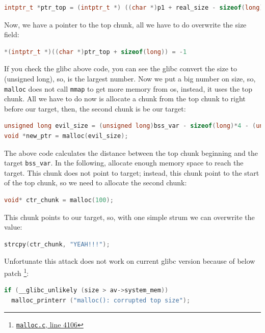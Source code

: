 \documentclass{masterthesis}
\newcommand*\libc{glibc}
\newcommand*\mallocc{\lstinline{malloc}\xspace}
\newcommand*\mmapc{\lstinline{mmap}\xspace}
\begin{document}
\begin{lstlisting}[language=c,frame=tlrb]
intptr_t *ptr_top = (intptr_t *) ((char *)p1 + real_size - sizeof(long));
\end{lstlisting}

Now, we have a pointer to the top chunk, all we have to do overwrite the size field:

\begin{lstlisting}[language=c,frame=tlrb]
*(intptr_t *)((char *)ptr_top + sizeof(long)) = -1
\end{lstlisting}

If you check the \libc{} above code, you can see the \libc{} convert the size to (unsigned long), so,  is the largest number. Now we put a big number on size, so, \mallocc{} does not call \mmapc{} to get more memory from os, instead, it uses the top chunk. All we have to do now is allocate a chunk from the top chunk to right before our target, then, the second chunk is be our target:

\begin{lstlisting}[language=c,frame=tlrb]
unsigned long evil_size = (unsigned long)bss_var - sizeof(long)*4 - (unsigned long)ptr_top;
void *new_ptr = malloc(evil_size);
\end{lstlisting}

The above code calculates the distance between the top chunk beginning and the target \lstinline{bss_var}. In the following, allocate enough memory space to reach the target. This chunk does not point to target; instead, this chunk point to the start of the top chunk, so we need to allocate the second chunk:

\begin{lstlisting}[language=c,frame=tlrb]
void* ctr_chunk = malloc(100);
\end{lstlisting}

This chunk points to our target, so, with one simple strum we can overwrite the value:

\begin{lstlisting}[language=c,frame=tlrb]
strcpy(ctr_chunk, "YEAH!!!");
\end{lstlisting}

Unfortunate this attack does not work on current \libc{} version because of below patch \footnote{\href{https://sourceware.org/git/?p=glibc.git;a=blob;f=malloc/malloc.c;h=f7cd29bc2f93e1082ee77800bd64a4b2a2897055;hb=9ea3686266dca3f004ba874745a4087a89682617\#l4106}{\texttt{malloc.c}, line 4106}}:
\begin{lstlisting}[language=c,frame=tlrb]
if (__glibc_unlikely (size > av->system_mem))
  malloc_printerr ("malloc(): corrupted top size");
\end{lstlisting}
\end{document}

